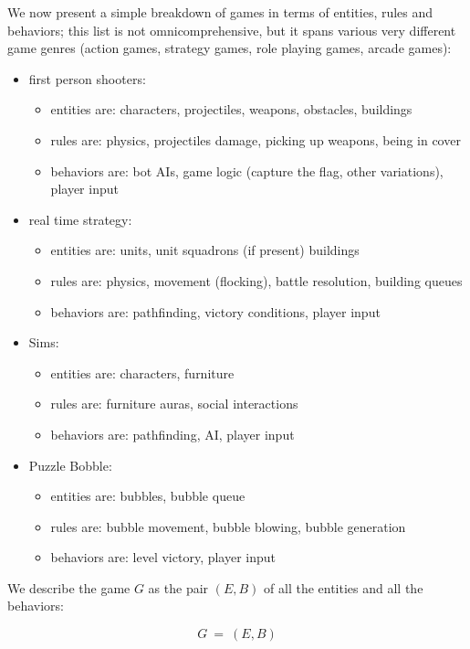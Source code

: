 We now present a simple breakdown of games in terms of entities, rules and behaviors; this list is not omnicomprehensive, but it spans various very different game genres (action games, strategy games, role playing games, arcade games):
\begin{itemize}
\item first person shooters:
\begin{itemize}
\item entities are: characters, projectiles, weapons, obstacles, buildings
\item rules are: physics, projectiles damage, picking up weapons, being in cover
\item behaviors are: bot AIs, game logic (capture the flag, other variations), player input
\end{itemize}

\item real time strategy:
\begin{itemize}
\item entities are: units, unit squadrons (if present) buildings
\item rules are: physics, movement (flocking), battle resolution, building queues
\item behaviors are: pathfinding, victory conditions, player input
\end{itemize}

\item Sims:
\begin{itemize}
\item entities are: characters, furniture
\item rules are: furniture auras, social interactions
\item behaviors are: pathfinding, AI, player input
\end{itemize}

\item Puzzle Bobble:
\begin{itemize}
\item entities are: bubbles, bubble queue
\item rules are: bubble movement, bubble blowing, bubble generation
\item behaviors are: level victory, player input
\end{itemize}
\end{itemize}

We describe the game $G$ as the pair $(E,B)$ of all the entities and all the behaviors:

$$ G\ =\ (E,B) $$

